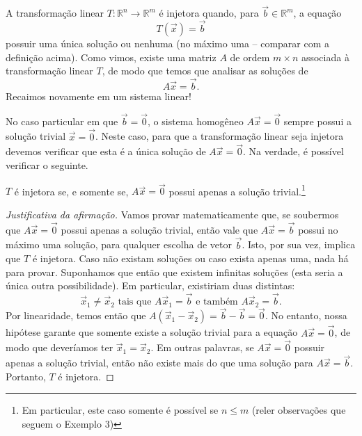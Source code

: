 \documentclass[../livro.tex]{subfiles}
\begin{document}
A transformação linear $T: \mathbb{R}^n \to \mathbb{R}^m$ é injetora quando, para $\vec{b} \in \mathbb{R}^m$, a equação
\begin{equation}
T(\vec{x}) = \vec{b}
\end{equation} possuir uma única solução ou nenhuma (no máximo uma -- comparar com a definição acima). Como vimos, existe uma matriz $A$ de ordem $m\times n$ associada à transformação linear $T$, de modo que temos que analisar as soluções de
\begin{equation}
A\vec{x} = \vec{b}.
\end{equation} Recaimos novamente em um sistema linear!

No caso particular em que $\vec{b} = \vec{0}$, o sistema homogêneo $A\vec{x} = \vec{0}$ sempre possui a solução trivial $\vec{x} = \vec{0}$. Neste caso, para que a transformação linear seja injetora devemos verificar que esta é a única solução de $A\vec{x} = \vec{0}$. Na verdade, é possível verificar o seguinte.



\begin{claim}
  $T$ é injetora se, e somente se, $A\vec{x} = \vec{0}$ possui apenas a solução trivial.\footnote{Em particular, este caso somente é possível se $n \le m$ (reler observações que seguem o Exemplo 3)}
\end{claim}
\begin{proof}[Justificativa da afirmação]
Vamos provar matematicamente que, se soubermos que $A\vec{x} = \vec{0}$ possui apenas a solução trivial, então vale que $A\vec{x} = \vec{b}$ possui no máximo uma solução, para qualquer escolha de vetor $\vec{b}$. Isto, por sua vez, implica que $T$ é injetora. Caso não existam soluções ou caso exista apenas uma, nada há para provar. Suponhamos que então que existem infinitas soluções (esta seria a única outra possibilidade). Em particular, existiriam duas distintas:
\begin{equation}
\vec{x}_1 \neq \vec{x}_2 \text{ tais que } A \vec{x}_1 = \vec{b} \text{ e também } A \vec{x}_2 = \vec{b}.
\end{equation} Por linearidade, temos então que $A (\vec{x}_1 - \vec{x}_2) = \vec{b} - \vec{b} = \vec{0}$. No entanto, nossa hipótese garante que somente existe a solução trivial para a equação $A\vec{x} = \vec{0}$, de modo que deveríamos ter $\vec{x}_1 = \vec{x}_2$. Em outras palavras, se $A\vec{x} = \vec{0}$ possuir apenas a solução trivial, então não existe mais do que uma solução para $A\vec{x} = \vec{b}$. Portanto, $T$ é injetora.
\end{proof}
\end{document}
